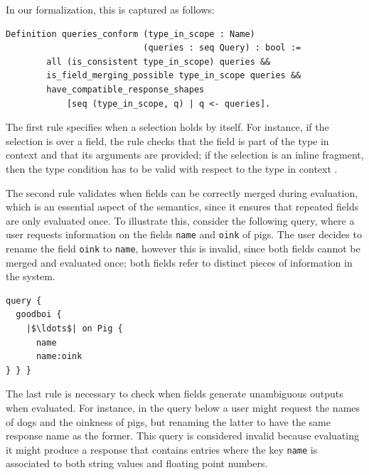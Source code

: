 In our formalization, this is captured as follows:


\begin{verbatim}
Definition queries_conform (type_in_scope : Name)
                           (queries : seq Query) : bool :=
        all (is_consistent type_in_scope) queries &&
        is_field_merging_possible type_in_scope queries &&
        have_compatible_response_shapes
            [seq (type_in_scope, q) | q <- queries].
\end{verbatim}

The first rule specifies when a selection  holds by itself. For instance, if the selection is over a field, the rule checks that the field is part of the type in context and that its arguments are provided; if the selection is an inline fragment, then the type condition has to be valid with respect to the type in context .%

The second rule validates when fields can be correctly merged during evaluation, which is an essential aspect of the semantics, since it ensures that repeated fields are only evaluated once. To illustrate this, consider the following query, where a user requests information on the fields \texttt{name} and \texttt{oink} of pigs. The user decides to rename the field \texttt{oink} to \texttt{name}, however this is invalid, since both fields cannot be merged and evaluated once; both fields refer to distinct pieces of information in the system.

\begin{verbatim}
query {
  goodboi {
    |$\ldots$| on Pig {
	  name
	  name:oink
} } }
\end{verbatim}

The last rule is necessary to check when fields generate unambiguous outputs when evaluated. For instance, in the query below a user might request the names of dogs and the oinkness of pigs, but renaming the latter to have the same response name as the former. This query is considered invalid because evaluating it might produce a response that contains entries where the key \texttt{name} is associated to both string values and floating point numbers. 

